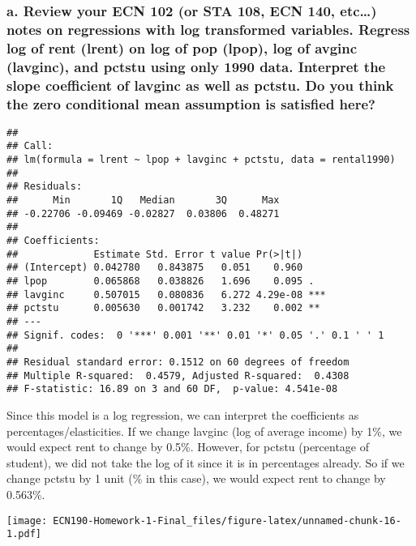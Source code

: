 \documentclass[
]{article}
\begin{document}
\hypertarget{a.-review-your-ecn-102-or-sta-108-ecn-140-etc-notes-on-regressions-with-log-transformed-variables.-regress-log-of-rent-lrent-on-log-of-pop-lpop-log-of-avginc-lavginc-and-pctstu-using-only-1990-data.-interpret-the-slope-coefficient-of-lavginc-as-well-as-pctstu.-do-you-think-the-zero-conditional-mean-assumption-is-satisfied-here}{%
\subsubsection{a. Review your ECN 102 (or STA 108, ECN 140, etc\ldots{})
notes on regressions with log transformed variables. Regress log of rent
(lrent) on log of pop (lpop), log of avginc (lavginc), and pctstu using
only 1990 data. Interpret the slope coefficient of lavginc as well as
pctstu. Do you think the zero conditional mean assumption is satisfied
here?}\label{a.-review-your-ecn-102-or-sta-108-ecn-140-etc-notes-on-regressions-with-log-transformed-variables.-regress-log-of-rent-lrent-on-log-of-pop-lpop-log-of-avginc-lavginc-and-pctstu-using-only-1990-data.-interpret-the-slope-coefficient-of-lavginc-as-well-as-pctstu.-do-you-think-the-zero-conditional-mean-assumption-is-satisfied-here}}

\begin{verbatim}
## 
## Call:
## lm(formula = lrent ~ lpop + lavginc + pctstu, data = rental1990)
## 
## Residuals:
##      Min       1Q   Median       3Q      Max 
## -0.22706 -0.09469 -0.02827  0.03806  0.48271 
## 
## Coefficients:
##             Estimate Std. Error t value Pr(>|t|)    
## (Intercept) 0.042780   0.843875   0.051    0.960    
## lpop        0.065868   0.038826   1.696    0.095 .  
## lavginc     0.507015   0.080836   6.272 4.29e-08 ***
## pctstu      0.005630   0.001742   3.232    0.002 ** 
## ---
## Signif. codes:  0 '***' 0.001 '**' 0.01 '*' 0.05 '.' 0.1 ' ' 1
## 
## Residual standard error: 0.1512 on 60 degrees of freedom
## Multiple R-squared:  0.4579, Adjusted R-squared:  0.4308 
## F-statistic: 16.89 on 3 and 60 DF,  p-value: 4.541e-08
\end{verbatim}

Since this model is a log regression, we can interpret the coefficients
as percentages/elasticities. If we change lavginc (log of average
income) by 1\%, we would expect rent to change by 0.5\%. However, for
pctstu (percentage of student), we did not take the log of it since it
is in percentages already. So if we change pctstu by 1 unit (\% in this
case), we would expect rent to change by 0.563\%.

\texttt{[image: ECN190-Homework-1-Final\_files/figure-latex/unnamed-chunk-16-1.pdf]}
\end{document}
